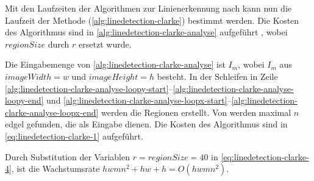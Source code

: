 Mit den Laufzeiten der Algorithmen zur Linienerkennung nach \citeauthor{clarke96} kann nun die Laufzeit der Methode
  (\autoref{alg:linedetection-clarke}) bestimmt werden. Die Kosten des Algorithmus sind in \autoref{alg:linedetection-clarke-analyse} aufgeführt , wobei $\mathit{regionSize}$ durch $r$ ersetzt wurde.

Die Eingabemenge von \autoref{alg:linedetection-clarke-analyse} ist $I_m$, wobei $I_m$ aus $\mathit{imageWidth} = w$
 und $\mathit{imageHeight} = h$ besteht. In der Schleifen in Zeile
 \ref{alg:linedetection-clarke-analyse-loopy-start}--\ref{alg:linedetection-clarke-analyse-loopy-end} und
 \ref{alg:linedetection-clarke-analyse-loopx-start}--\ref{alg:linedetection-clarke-analyse-loopx-end} werden die
 Regionen erstellt. Von  werden maximal $n$ \gls{edgel} gefunden, die 
 als Eingabe dienen. Die Kosten des Algorithmus sind in \autoref{eq:linedetection-clarke-1} aufgeführt.

Durch Substitution der Variablen $r = \mathit{regionSize} = 40$ in \autoref{eq:linedetection-clarke-4}, ist die
 Wachstumsrate $hwmn^2 + hw + h = O(hwmn^2)$.
